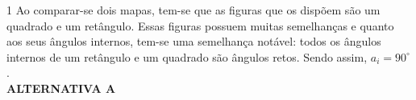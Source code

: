 \begin{solucoes}{1}
    \solucao
    Ao comparar-se dois mapas, tem-se que as figuras que os dispõem são um quadrado e um retângulo. Essas figuras possuem muitas semelhanças e quanto aos seus ângulos internos, tem-se uma semelhança notável: todos os ângulos internos de um retângulo e um quadrado são ângulos retos. Sendo assim, $a_i=90^\circ$.\\
    \textbf{ALTERNATIVA A}
\end{solucoes}


